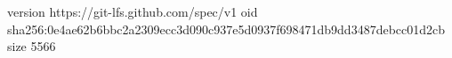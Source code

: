 version https://git-lfs.github.com/spec/v1
oid sha256:0e4ae62b6bbc2a2309ecc3d090c937e5d0937f698471db9dd3487debcc01d2cb
size 5566
